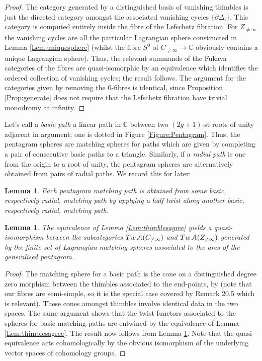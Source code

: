 \documentclass[reqno,10pt]{amsart}
\numberwithin{equation}{section}
\newcommand{\bC}{{\mathbb C}}
\newcommand{\scrA}{\EuScript{A}}
\newtheorem{Lemma}[thm]{Lemma}
\theoremstyle{remark}
\begin{document}
\begin{proof}
The  category generated by a distinguished basis of vanishing thimbles is just the directed category amongst the associated vanishing cycles $\{\partial \Delta_i\}$.  This category is computed entirely inside the fibre of the Lefschetz fibration. For $Z_{\neq\infty}$ the vanishing cycles are all the particular Lagrangian sphere constructed in Lemma \ref{Lem:uniquesphere} (whilst the fibre $S^0$ of $C_{\neq\infty}\rightarrow \bC$ obviously contains a unique Lagrangian sphere).  Thus, the relevant summands of the Fukaya categories of the fibres are quasi-isomorphic by an equivalence which identifies the ordered collection of vanishing cycles;  the result follows. The argument for the categories given by removing the 0-fibres is identical, since Proposition \ref{Prop:generate} does not require that the Lefschetz fibration have trivial monodromy at infinity.
\end{proof}

Let's call a \emph{basic path} a linear path in $\bC$ between two $(2g+1)$-st roots of unity adjacent in argument; one is dotted in Figure \ref{Figure:Pentagram}.  Thus, the pentagram spheres are matching spheres for paths which are given by completing a pair of consecutive basic paths to a triangle. Similarly, if a \emph{radial path} is one from the origin to a root of unity, the pentagram spheres are alternatively obtained from pairs of radial paths. We record this for later:

\begin{Lemma} \label{Lem:BasictoPent}
Each pentagram matching path is obtained from some basic, respectively radial, matching path by applying a half twist  along another basic, respectively radial, matching path.
\end{Lemma}

\begin{Lemma} \label{Lem:pentagramsagree}
The equivalence of Lemma \ref{Lem:thimblesagree} yields a quasi-isomorphism between the subcategories $Tw \,\scrA(C_{\neq\infty})$ and $Tw\,\scrA(Z_{\neq\infty})$ generated by the finite set of Lagrangian matching spheres associated to the arcs of the generalised pentagram.
\end{Lemma}

\begin{proof}
The matching sphere for a basic path  is the cone on a distinguished degree zero morphism between the thimbles associated to the end-points, by \cite[Proposition 18.21 \& Remark 20.5]{FCPLT} (note that our fibres are semi-simple, so it is the special case covered by Remark 20.5 which is relevant).  These cones amongst thimbles involve identical data in the two spaces.  The same argument shows that the twist functors associated to the spheres for basic matching paths are entwined by the equivalence of Lemma \ref{Lem:thimblesagree}.  The result now follows from Lemma \ref{Lem:BasictoPent}. Note that the quasi-equivalence acts cohomologically by the obvious isomorphism of the underlying vector spaces of cohomology groups. \end{proof}
\end{document}
